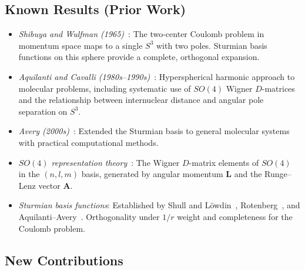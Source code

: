 \documentclass[aps,pra,twocolumn,superscriptaddress,longbibliography]{revtex4-2}
\begin{document}
\subsection{Known Results (Prior Work)}

\begin{itemize}

\item \textit{Shibuya and Wulfman (1965)}~\cite{Shibuya1965}: The
two-center Coulomb problem in momentum space maps to a single $S^3$
with two poles.  Sturmian basis functions on this sphere provide a
complete, orthogonal expansion.

\item \textit{Aquilanti and Cavalli
(1980s--1990s)}~\cite{Aquilanti1986,Aquilanti1990}: Hyperspherical
harmonic approach to molecular problems, including systematic use of
$SO(4)$ Wigner $D$-matrices and the relationship between internuclear
distance and angular pole separation on $S^3$.

\item \textit{Avery (2000s)}~\cite{Avery2006}: Extended the Sturmian
basis to general molecular systems with practical computational methods.

\item \textit{$SO(4)$ representation theory}~\cite{Bander1966,%
Biedenharn1981}: The Wigner $D$-matrix elements of $SO(4)$ in the
$(n, l, m)$ basis, generated by angular momentum $\mathbf{L}$ and the
Runge--Lenz vector $\mathbf{A}$.

\item \textit{Sturmian basis functions}: Established by Shull and
L\"owdin~\cite{shull_lowdin}, Rotenberg~\cite{rotenberg}, and
Aquilanti--Avery~\cite{aquilanti_avery,avery_book}.  Orthogonality
under $1/r$ weight and completeness for the Coulomb problem.

\end{itemize}

\subsection{New Contributions}
\end{document}
